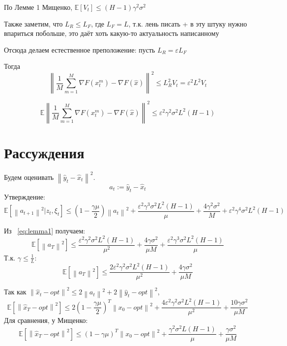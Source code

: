 \documentclass{article}
\theoremstyle{plain}
\newcommand{\norm}[1]{\left\|#1\right\|}
\newcommand{\E}{\mathbb{E}}
\begin{document}
По Лемме 1 Мищенко, \(\E[V_t] \leq (H-1) \gamma^2 \sigma^2\)

Также заметим, что $L_R \leq L_F$, где $L_F = L$, т.к. лень писать + в эту штуку нужно впариться побольше, это даёт хоть какую-то актуальность написанному

Отсюда делаем естественное преположение: пусть $L_R = \varepsilon L_F$

Тогда 
\[\norm{\frac{1}{M}\sum^M_{m=1} \nabla F(x^m_t) - \nabla F(\hat{x})}^2 
\leq 
L^2_R V_t = \varepsilon^2 L^2 V_t\]


\begin{equation}\label{eq:main_assumption}
\E\norm{\frac{1}{M}\sum^M_{m=1} \nabla F(x^m_t) - \nabla F(\hat{x})}^2
\leq 
\varepsilon^2 \gamma^2 \sigma^2 L^2 (H-1)
\end{equation}

\section{Рассуждения}

Будем оценивать $\norm{\hat{y}_t - \hat{x}_t}^2$.
\[a_t := \hat{y}_t - \hat{x}_t\]
Утверждение:
\begin{equation}\label{eq:lemma1}
\E[\norm{a_{t+1}}^2 | z_t, \xi_t]
\leq
(1 - \frac{\gamma \mu}{2}) \norm{a_{t}}^2 + \frac{\varepsilon^2 \gamma^3 \sigma^2 L^2 (H-1)}{\mu} + 
\frac{4 \gamma^2 \sigma^2}{M} + \varepsilon^2 \gamma^4 \sigma^2 L^2 (H-1)
\end{equation}

Из ~\eqref{eq:lemma1} получаем:
\begin{equation}\label{eq:lemma2}
\E[\norm{a_{T}}^2]
\leq
\frac{\varepsilon^2 \gamma^2 \sigma^2 L^2 (H-1)}{\mu^2} + 
\frac{4 \gamma \sigma^2}{\mu M} + \frac{\varepsilon^2 \gamma^3 \sigma^2 L^2 (H-1)}{\mu}
\end{equation}
Т.к. $\gamma \leq \frac{1}{L}$:
\begin{equation}\label{eq:lemma2'}
\E[\norm{a_{T}}^2]
\leq
\frac{2 \varepsilon^2 \gamma^2 \sigma^2 L^2 (H-1)}{\mu^2}+ 
\frac{4 \gamma \sigma^2}{\mu M}
\end{equation}

Так как $\norm{\hat{x}_t - opt}^2 \leq 2 \norm{a_t}^2 + 2 \norm{\hat{y}_t - opt}^2$,
\begin{equation}\label{eq:lemma2'}
\E[\norm{\hat{x}_T - opt}^2]
\leq
2 (1 - \frac{\gamma \mu}{2})^T \norm{x_0 - opt}^2 + \frac{4 \varepsilon^2 \gamma^2 \sigma^2 L^2 (H-1)}{\mu^2}+ 
\frac{10 \gamma \sigma^2}{\mu M}
\end{equation}
Для сравнения, у Мищенко:
\begin{equation}\label{eq:lemma2'}
\E[\norm{\hat{x}_T - opt}^2]
\leq
(1 - \gamma \mu)^T \norm{x_0 - opt}^2 + \frac{\gamma^2 \sigma^2 L (H-1)}{\mu}+ 
\frac{\gamma \sigma^2}{\mu M}
\end{equation}
\end{document}
